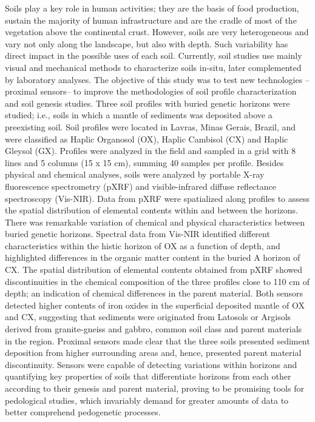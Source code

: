 Soils play a key role in human activities; they are the basis of food
production, sustain the majority of human infrastructure and are the cradle of
most of the vegetation above the continental crust. However, soils are very
heterogeneous and vary not only along the landscape, but also with depth. Such
variability has direct impact in the possible uses of each soil. Currently, soil
studies use mainly visual and mechanical methods to characterize soils in-situ,
later complemented by laboratory analyses. The objective of this study was to
test new technologies –proximal sensors– to improve the methodologies of soil
profile characterization and soil genesis studies. Three soil profiles with
buried genetic horizons were studied; i.e., soils in which a mantle of sediments
was deposited above a preexisting soil. Soil profiles were located in Lavras,
Minas Gerais, Brazil, and were classified as Haplic Organosol (OX), Haplic
Cambisol (CX) and Haplic Gleysol (GX). Profiles were analyzed in the field and
sampled in a grid with 8 lines and 5 columns (15 x 15 cm), summing 40 samples
per profile. Besides physical and chemical analyses, soils were analyzed by
portable X-ray fluorescence spectrometry (pXRF) and visible-infrared diffuse
reflectance spectroscopy (Vis-NIR). Data from pXRF were spatialized along
profiles to assess the spatial distribution of elemental contents within and
between the horizons. There was remarkable variation of chemical and physical
characteristics between buried genetic horizons. Spectral data from Vis-NIR
identified different characteristics within the histic horizon of OX as a
function of depth, and highlighted differences in the organic matter content in
the buried A horizon of CX. The spatial distribution of elemental contents
obtained from pXRF showed discontinuities in the chemical composition of the
three profiles close to 110 cm of depth; an indication of chemical differences
in the parent material. Both sensors detected higher contents of iron oxides in
the superficial deposited mantle of OX and CX, suggesting that sediments were
originated from Latosols or Argisols derived from granite-gneiss and gabbro,
common soil class and parent materials in the region. Proximal sensors made
clear that the three soils presented sediment deposition from higher surrounding
areas and, hence, presented parent material discontinuity. Sensors were capable
of detecting variations within horizons and quantifying key properties of soils
that differentiate horizons from each other according to their genesis and
parent material, proving to be promising tools for pedological studies, which
invariably demand for greater amounts of data to better comprehend pedogenetic
processes.